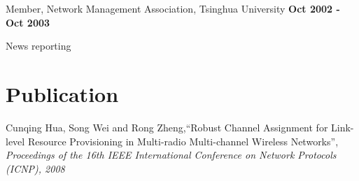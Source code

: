 \documentclass[overlapped, line]{resume}
\begin{document}
\begin{resume}
         Member, Network Management Association, Tsinghua University \hfill {\bf Oct 2002 -  Oct 2003}\\
         \vspace{-10pt}      %
         \begin{list2}
         \item News reporting
         \end{list2}  \vspace{-5pt}

         \vspace{-15pt}\section{Publication}

         Cunqing Hua, Song Wei and Rong Zheng,``Robust Channel Assignment for Link-level Resource Provisioning in Multi-radio Multi-channel Wireless Networks'', \textsl{Proceedings of the 16th IEEE International Conference on Network Protocols (ICNP), 2008} 

\end{resume}
\end{document}
